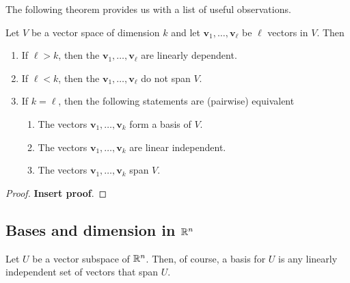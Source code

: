 \documentclass[10pt, a4paper]{article}
\newcommand{\mbf}[1]{\mathbf{#1}}
\begin{document}
The following theorem provides us with a list of useful observations.
\begin{theorem}
    Let $V$ be a vector space of dimension $k$ and let $\mbf{v}_1, \dotsc, \mbf{v}_{\ell}$ be $\ell$ vectors in $V$.
    Then
    \begin{enumerate}[label = (\roman*)]
        \item If $\ell > k$,
        then the $\mbf{v}_1, \dotsc, \mbf{v}_{\ell}$ are linearly dependent.
        \item If $\ell < k$,
        then the $\mbf{v}_1, \dotsc, \mbf{v}_{\ell}$ do not span $V$.
        \item If $k = \ell$,
        then the following statements are (pairwise) equivalent
        \begin{enumerate}[label = (\alph*)]
            \item The vectors $\mbf{v}_1, \dotsc, \mbf{v}_k$ form a basis of $V$.
            \item The vectors $\mbf{v}_1, \dotsc, \mbf{v}_k$ are linear independent.
            \item The vectors $\mbf{v}_1, \dotsc, \mbf{v}_k$ span $V$.
        \end{enumerate}
    \end{enumerate}
    \begin{proof}
        \textbf{Insert proof}.
    \end{proof}
\end{theorem}

\subsection{Bases and dimension in $\mathbb{R} ^ n$}
\begin{remark}
    Let $U$ be a vector subspace of $\mathbb{R} ^ n$.
    Then,
    of course,
    a basis for $U$ is any linearly independent set of vectors that span $U$.
\end{remark}
\end{document}
